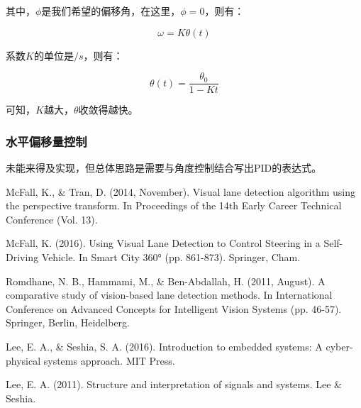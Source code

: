 \documentclass[11pt]{article}
\begin{document}
其中，$\phi$是我们希望的偏移角，在这里，$\phi = 0$，则有：

$$
\omega = K \theta(t)
$$

系数$K$的单位是$/s$，则有：

$$
\theta(t) = \frac{\theta_0}{1 - Kt}
$$

可知，$K$越大，$\theta$收敛得越快。

\subsubsection{水平偏移量控制}

未能来得及实现，但总体思路是需要与角度控制结合写出PID的表达式。


\begin{thebibliography}{99}

 McFall, K., \& Tran, D. (2014, November). Visual lane detection algorithm using the perspective transform. In Proceedings of the 14th Early Career Technical Conference (Vol. 13).

 McFall, K. (2016). Using Visual Lane Detection to Control Steering in a Self-Driving Vehicle. In Smart City 360° (pp. 861-873). Springer, Cham.

 Romdhane, N. B., Hammami, M., \& Ben-Abdallah, H. (2011, August). A comparative study of vision-based lane detection methods. In International Conference on Advanced Concepts for Intelligent Vision Systems (pp. 46-57). Springer, Berlin, Heidelberg.

 Lee, E. A., \& Seshia, S. A. (2016). Introduction to embedded systems: A cyber-physical systems approach. MIT Press.

 Lee, E. A. (2011). Structure and interpretation of signals and systems. Lee \& Seshia. 

\end{thebibliography}
\end{document}
